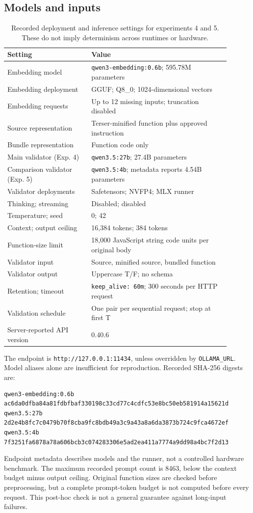 \subsection{Models and inputs}
\begin{table}[htbp]
\caption{Recorded deployment and inference settings for experiments 4 and 5. These do not imply determinism across runtimes or hardware.}
\label{tab:model-settings}
\centering\small
\begin{tabular}{p{0.34\linewidth}p{0.56\linewidth}}
\toprule
Setting & Value\\
\midrule
Embedding model & \texttt{qwen3-embedding:0.6b}; 595.78M parameters\\
Embedding deployment & GGUF; Q8\_0; 1024-dimensional vectors\\
Embedding requests & Up to 12 missing inputs; truncation disabled\\
Source representation & Terser-minified function plus approved instruction\\
Bundle representation & Function code only\\
Main validator (Exp. 4) & \texttt{qwen3.5:27b}; 27.4B parameters\\
Comparison validator (Exp. 5) & \texttt{qwen3.5:4b}; metadata reports 4.54B parameters\\
Validator deployments & Safetensors; NVFP4; MLX runner\\
Thinking; streaming & Disabled; disabled\\
Temperature; seed & 0; 42\\
Context; output ceiling & 16,384 tokens; 384 tokens\\
Function-size limit & 18,000 JavaScript string code units per original body\\
Validator input & Source, minified source, bundled function\\
Validator output & Uppercase T/F; no schema\\
Retention; timeout & \texttt{keep\_alive: 60m}; 300 seconds per HTTP request\\
Validation schedule & One pair per sequential request; stop at first T\\
Server-reported API version & 0.40.6\\
\bottomrule
\end{tabular}
\end{table}
The endpoint is \nolinkurl{http://127.0.0.1:11434}, unless overridden by \texttt{OLLAMA\_URL}. Model aliases alone are insufficient for reproduction. Recorded SHA-256 digests are:
\begin{lstlisting}
qwen3-embedding:0.6b
ac6da0dfba84a81fdbfbaf330198c33cd77c4cdfc53e8bc50eb581914a15621d
qwen3.5:27b
2d2e4b8fc7c0479b70f8cba9fc8bdb49a3c9a43a8a6da3873b724c9fca4672ef
qwen3.5:4b
7f3251fa6878a78a606bcb3c074283306e5ad2ea411a7774a9dd98a4bc7f2d13
\end{lstlisting}
Endpoint metadata describes models and the runner, not a controlled hardware benchmark. The maximum recorded prompt count is 8463, below the context budget minus output ceiling. Original function sizes are checked before preprocessing, but a complete prompt-token budget is not computed before every request. This post-hoc check is not a general guarantee against long-input failures.

